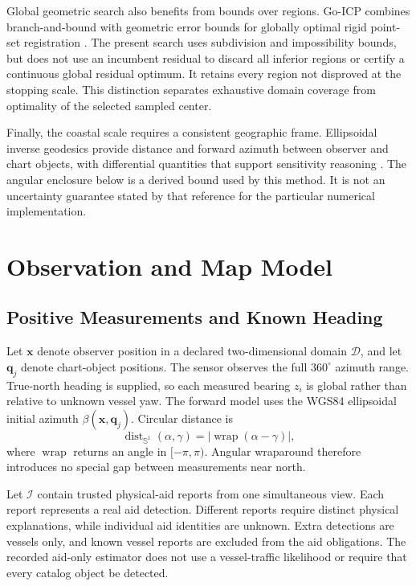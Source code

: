 \documentclass[conference]{IEEEtran}
\newcommand{\angdist}{\operatorname{dist}_{\mathbb S^1}}
\newcommand{\wrap}{\operatorname{wrap}}
\begin{document}
Global geometric search also benefits from bounds over regions. Go-ICP combines branch-and-bound with geometric error bounds for globally optimal rigid point-set registration \cite{Yang2016GlobalRegistration}. The present search uses subdivision and impossibility bounds, but does not use an incumbent residual to discard all inferior regions or certify a continuous global residual optimum. It retains every region not disproved at the stopping scale. This distinction separates exhaustive domain coverage from optimality of the selected sampled center.

Finally, the coastal scale requires a consistent geographic frame. Ellipsoidal inverse geodesics provide distance and forward azimuth between observer and chart objects, with differential quantities that support sensitivity reasoning \cite{Karney2013Geodesics}. The angular enclosure below is a derived bound used by this method. It is not an uncertainty guarantee stated by that reference for the particular numerical implementation.

\section{Observation and Map Model}
\subsection{Positive Measurements and Known Heading}
Let $\mathbf{x}$ denote observer position in a declared two-dimensional domain $\mathcal D$, and let $\mathbf{q}_j$ denote chart-object positions. The sensor observes the full $360^\circ$ azimuth range. True-north heading is supplied, so each measured bearing $z_i$ is global rather than relative to unknown vessel yaw. The forward model uses the WGS84 ellipsoidal initial azimuth $\beta(\mathbf{x},\mathbf{q}_j)$. Circular distance is
\begin{equation}
 \angdist(\alpha,\gamma)=|\wrap(\alpha-\gamma)|,
 \label{eq:circular}
\end{equation}
where $\wrap$ returns an angle in $[-\pi,\pi)$. Angular wraparound therefore introduces no special gap between measurements near north.

Let $\mathcal I$ contain trusted physical-aid reports from one simultaneous view. Each report represents a real aid detection. Different reports require distinct physical explanations, while individual aid identities are unknown. Extra detections are vessels only, and known vessel reports are excluded from the aid obligations. The recorded aid-only estimator does not use a vessel-traffic likelihood or require that every catalog object be detected.
\end{document}
